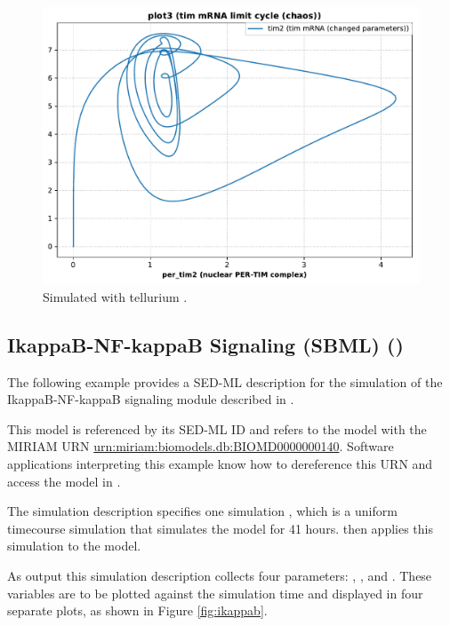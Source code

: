 \begin{figure}[ht]
\begin{minipage}{0.47\textwidth}
		\includegraphics[width=1.0\textwidth]{examples/leloup-sbml/results/tellurium/plot3}
        \caption{Simulated with tellurium \citep{tellurium}.}
    \end{minipage}
    \label{fig:leloup-sbml}
\end{figure}



\subsection{IkappaB-NF-kappaB Signaling (SBML) ()}
The following example provides a SED-ML description for the simulation of the IkappaB-NF-kappaB signaling module described in \citep{hoffmann2002ikappab}.

This model is referenced by its SED-ML ID  and refers to the model with the MIRIAM URN \url{urn:miriam:biomodels.db:BIOMD0000000140}. 
Software applications interpreting this example know how to dereference this URN and access the model in \biom \citep{N+06}.

The simulation description specifies one simulation , which is a uniform timecourse simulation that simulates the model for 41 hours.  then applies this simulation to the model.

As output this simulation description collects four parameters: , ,  and . These variables are to be plotted against the simulation time and displayed in four separate plots, as shown in Figure \ref{fig:ikappab}.

